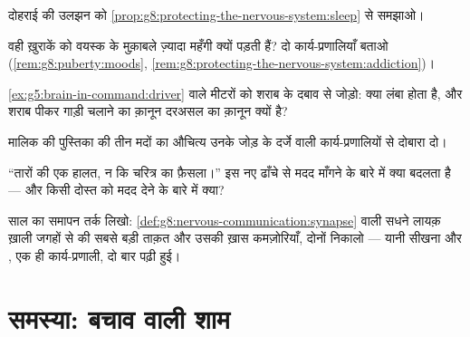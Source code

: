 \begin{exercise}[$\star\star$]\label{exo:g8:protecting-the-nervous-system:7}
दोहराई की उलझन को
\cref{prop:g8:protecting-the-nervous-system:sleep} से समझाओ।
\end{exercise}

\begin{exercise}[$\star\star$]\label{exo:g8:protecting-the-nervous-system:8}
वही ख़ुराकें   को वयस्क के मुक़ाबले ज़्यादा महँगी क्यों
पड़ती हैं? दो कार्य-प्रणालियाँ बताओ
(\cref{rem:g8:puberty:moods},
\cref{rem:g8:protecting-the-nervous-system:addiction})।
\end{exercise}

\begin{exercise}[$\star\star$]\label{exo:g8:protecting-the-nervous-system:9}
\cref{ex:g5:brain-in-command:driver} वाले मीटरों को शराब के दबाव से
जोड़ो: क्या लंबा होता है, और शराब पीकर गाड़ी चलाने का क़ानून दरअसल
 का क़ानून क्यों है?
\end{exercise}

\begin{exercise}[$\star\star$]\label{exo:g8:protecting-the-nervous-system:10}
मालिक की पुस्तिका की तीन मदों का औचित्य उनके जोड़ के दर्जे वाली
कार्य-प्रणालियों से दोबारा दो।
\end{exercise}

\begin{exercise}[$\star\star$]\label{exo:g8:protecting-the-nervous-system:11}
``तारों की एक हालत, न कि चरित्र का फ़ैसला।'' इस नए ढाँचे से मदद माँगने
के बारे में क्या बदलता है --- और किसी दोस्त को मदद देने के बारे में
क्या?
\end{exercise}

\begin{exercise}[$\star\star\star$]\label{exo:g8:protecting-the-nervous-system:12}
साल का समापन तर्क लिखो: \cref{def:g8:nervous-communication:synapse}
वाली सधने लायक़ ख़ाली जगहों से  की सबसे बड़ी ताक़त और उसकी
ख़ास कमज़ोरियाँ, दोनों निकालो --- यानी सीखना और , एक ही
कार्य-प्रणाली, दो बार पढ़ी हुई।
\end{exercise}

\section{समस्या: बचाव वाली शाम}

